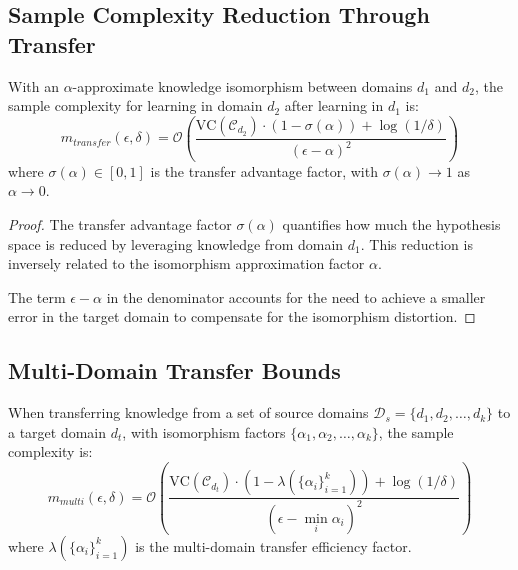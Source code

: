 \subsection{Sample Complexity Reduction Through Transfer}

\begin{theorem}
With an $\alpha$-approximate knowledge isomorphism between domains $d_1$ and $d_2$, the sample complexity for learning in domain $d_2$ after learning in $d_1$ is:
\begin{equation}
m_{transfer}(\epsilon, \delta) = \mathcal{O}\left(\frac{\text{VC}(\mathcal{C}_{d_2}) \cdot (1 - \sigma(\alpha)) + \log(1/\delta)}{(\epsilon - \alpha)^2}\right)
\end{equation}
where $\sigma(\alpha) \in [0, 1]$ is the transfer advantage factor, with $\sigma(\alpha) \rightarrow 1$ as $\alpha \rightarrow 0$.
\end{theorem}

\begin{proof}
The transfer advantage factor $\sigma(\alpha)$ quantifies how much the hypothesis space is reduced by leveraging knowledge from domain $d_1$. This reduction is inversely related to the isomorphism approximation factor $\alpha$.

The term $\epsilon - \alpha$ in the denominator accounts for the need to achieve a smaller error in the target domain to compensate for the isomorphism distortion.
\end{proof}

\subsection{Multi-Domain Transfer Bounds}

\begin{theorem}
When transferring knowledge from a set of source domains $\mathcal{D}_s = \{d_1, d_2, \ldots, d_k\}$ to a target domain $d_t$, with isomorphism factors $\{\alpha_1, \alpha_2, \ldots, \alpha_k\}$, the sample complexity is:
\begin{equation}
m_{multi}(\epsilon, \delta) = \mathcal{O}\left(\frac{\text{VC}(\mathcal{C}_{d_t}) \cdot (1 - \lambda(\{\alpha_i\}_{i=1}^k)) + \log(1/\delta)}{(\epsilon - \min_i \alpha_i)^2}\right)
\end{equation}
where $\lambda(\{\alpha_i\}_{i=1}^k)$ is the multi-domain transfer efficiency factor.
\end{theorem}

